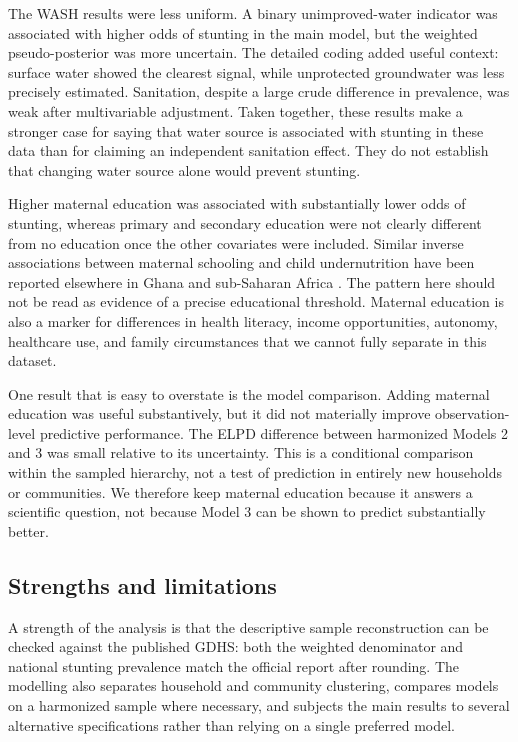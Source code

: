 \documentclass[11pt]{article}
\begin{document}
The WASH results were less uniform. A binary unimproved-water indicator was associated with higher odds of stunting in the main model, but the weighted pseudo-posterior was more uncertain. The detailed coding added useful context: surface water showed the clearest signal, while unprotected groundwater was less precisely estimated. Sanitation, despite a large crude difference in prevalence, was weak after multivariable adjustment. Taken together, these results make a stronger case for saying that water source is associated with stunting in these data than for claiming an independent sanitation effect. They do not establish that changing water source alone would prevent stunting.

Higher maternal education was associated with substantially lower odds of stunting, whereas primary and secondary education were not clearly different from no education once the other covariates were included. Similar inverse associations between maternal schooling and child undernutrition have been reported elsewhere in Ghana and sub-Saharan Africa \citep{AhetoEtAl2015,TakeleEtAl2022,AgyenEtAl2024}. The pattern here should not be read as evidence of a precise educational threshold. Maternal education is also a marker for differences in health literacy, income opportunities, autonomy, healthcare use, and family circumstances that we cannot fully separate in this dataset.

One result that is easy to overstate is the model comparison. Adding maternal education was useful substantively, but it did not materially improve observation-level predictive performance. The ELPD difference between harmonized Models 2 and 3 was small relative to its uncertainty. This is a conditional comparison within the sampled hierarchy, not a test of prediction in entirely new households or communities. We therefore keep maternal education because it answers a scientific question, not because Model 3 can be shown to predict substantially better.

\subsection{Strengths and limitations}

A strength of the analysis is that the descriptive sample reconstruction can be checked against the published GDHS: both the weighted denominator and national stunting prevalence match the official report after rounding. The modelling also separates household and community clustering, compares models on a harmonized sample where necessary, and subjects the main results to several alternative specifications rather than relying on a single preferred model.
\end{document}
